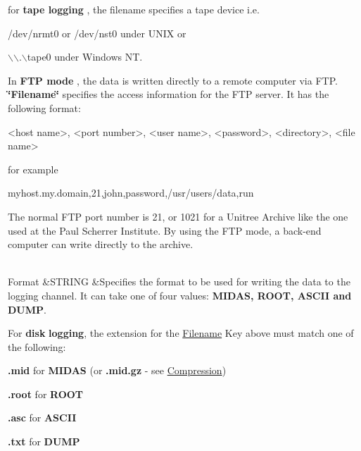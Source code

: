 \begin{table}[h]
\begin{TabularC}{3}
\begin{DoxyItemize}
\item for {\bfseries  tape logging }, the filename specifies a tape device i.e.
\begin{DoxyItemize}
\item /dev/nrmt0 or /dev/nst0 under UNIX or
\item $\backslash$$\backslash$.$\backslash$tape0 under Windows NT.
\end{DoxyItemize}
\item In {\bfseries  FTP mode }, the data is written directly to a remote computer via FTP. {\bfseries \char`\"{}Filename\char`\"{}} specifies the access information for the FTP server. It has the following format:
\end{DoxyItemize}


\begin{DoxyCode}
  <host name>, <port number>, <user name>, <password>, <directory>, <file name>
\end{DoxyCode}
 for example 
\begin{DoxyCode}
  myhost.my.domain,21,john,password,/usr/users/data,run%
\end{DoxyCode}
 The normal FTP port number is 21, or 1021 for a Unitree Archive like the one used at the Paul Scherrer Institute. By using the FTP mode, a back-\/end computer can write directly to the archive.



\\
\label{F_Logging_Data_F_Logger_CS_Format}
\hypertarget{F_Logging_Data_F_Logger_CS_Format}{}
 \label{F_Logging_Data_idx_Logging_Data_Format}
\hypertarget{F_Logging_Data_idx_Logging_Data_Format}{}
 Format  &STRING  &Specifies the format to be used for writing the data to the logging channel. It can take one of four values: {\bfseries MIDAS, ROOT, ASCII and DUMP}. \par


For {\bfseries disk} {\bfseries logging}, the extension for the \hyperlink{F_Logging_Data_F_Logger_CS_Filename}{Filename} Key above must match one of the following:
\begin{DoxyItemize}
\item {\bfseries  .mid } for {\bfseries MIDAS} (or {\bfseries .mid.gz} -\/ see \hyperlink{F_Logging_Data_F_Logger_CS_Compression}{Compression})
\item {\bfseries  .root } for {\bfseries ROOT} 
\item {\bfseries  .asc } for {\bfseries ASCII} 
\item {\bfseries  .txt } for {\bfseries DUMP} 
\end{DoxyItemize}


\end{TabularC}
\end{table}
